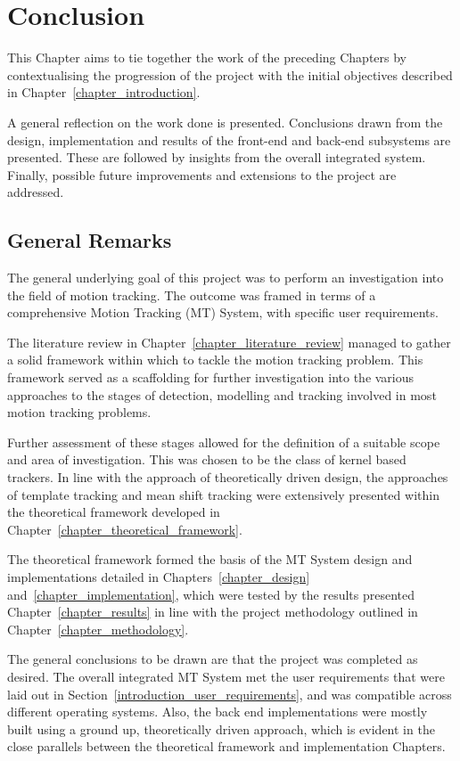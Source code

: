 \chapter{Conclusion}\label{chapter_conclusion}
This Chapter aims to tie together the work of the preceding Chapters
by contextualising the progression of the project with the initial objectives 
described in Chapter~\ref{chapter_introduction}.

A general reflection on the work done is presented. Conclusions drawn from
the design, implementation and results of the front-end and back-end subsystems
are presented. These are followed by insights from the overall integrated
system. Finally, possible future improvements and extensions to the project are
addressed.

\section{General Remarks}
The general underlying goal of this project was to perform an investigation into the
field of motion tracking. The outcome was framed in terms of a comprehensive Motion
Tracking (MT) System, with specific user requirements. 

The literature review in Chapter~\ref{chapter_literature_review} 
managed to gather a solid framework within which to tackle the motion tracking
problem. This framework served as a scaffolding for further investigation into the
various approaches to the stages of detection, modelling and tracking involved
in most motion tracking problems. 

Further assessment of these stages allowed for the definition of a suitable
scope and area of investigation. This was chosen to be the class of kernel based
trackers. In line with the approach of theoretically driven design, the
approaches of template tracking and mean shift tracking were extensively
presented within the theoretical framework developed in
Chapter~\ref{chapter_theoretical_framework}. 

The theoretical framework formed the basis of the MT System design and
implementations detailed in Chapters~\ref{chapter_design}
and~\ref{chapter_implementation}, which were tested by the results presented
Chapter~\ref{chapter_results} in line with the project methodology
outlined in Chapter~\ref{chapter_methodology}.

The general conclusions to be drawn are that the project was completed as
desired. The overall integrated MT System met the user requirements that were
laid out in Section~\ref{introduction_user_requirements}, and was compatible
across different operating systems. Also, the back end
implementations were mostly built using a ground up, theoretically driven
approach, which is evident in the close parallels between the theoretical framework
and implementation Chapters.

